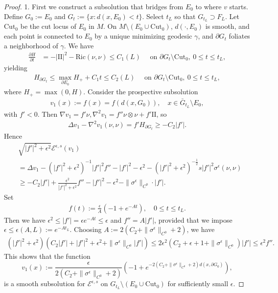 \documentclass[11pt, letterpaper]{amsart}
\theoremstyle{definition}
\theoremstyle{remark}
\begin{document}
\begin{appendix}
\begin{proof}
	1. First we construct a subsolution that bridges from $E_0$ to where $v$ starts. Define $G_0 := E_0$ and $G_t := \{x: d(x, E_0) < t\} $. Select $t_L$ so that $G_{t_L} \supset F_L$. Let $\mathrm{Cut}_0$ be the cut locus of $E_0$ in $M$. On $M \setminus (E_0 \cup \mathrm{Cut}_0)$, $d(\cdot , E_0)$ is smooth, and each point is connected to $E_0$ by a unique minimizing geodesic $\gamma $, and $\partial G_t$ foliates a neighborhood of $\gamma $. We have
	\begin{align*}
		\frac{\partial H}{\partial t} &= - |\mathrm{II}|^2 - \mathrm{Ric}(\nu ,\nu ) \leq C_1(L)\quad  \text{ on } \partial G_t \setminus \mathrm{Cut}_0, \ 0 \leq t \leq t_L,
	\end{align*} 
	yielding
	\begin{align*}
		H_{\partial G_t} \leq \max_{\partial E_0} H_{+} + C_1 t \leq C_2(L) \quad  \text{ on } \partial G_t \setminus \mathrm{Cut}_0, \ 0 \leq t \leq t_L,
	\end{align*} 
	where $H_{+} = \max (0, H)$.  Consider the prospective subsolution
	\begin{align*}
		v_1(x) := f(x) = f(d(x, G_0) ),\quad x \in \bar{G}_{t_L}\setminus E_0,
	\end{align*} 
	with $f'<0$. Then $\nabla v_1 = f' \nu , \nabla ^2 v_1 = f'' \nu \otimes \nu + f' \mathrm{II}$, so
	\begin{align*}
		\Delta v_1 - \nabla ^2 v_1(\nu ,\nu ) = f' H_{\partial G_t} \geq - C_2|f'| .
	\end{align*} 
	Hence
	\begin{align*}
		&\sqrt{|f'|^2+ \epsilon ^2} \mathcal{E}^{\epsilon ,s}(v_1) \\
		&= \Delta v_1 -  \left( |f'|^2 + \epsilon ^2 \right) ^{-1} |f'|^2 f'' - |f'|^2- \epsilon ^2 - \left( |f'|^2+ \epsilon ^2 \right) ^{-\frac{1}{2}} s|f'|^2 \sigma ^{\epsilon } (\nu ,\nu ) \\
		&\geq -C_2 |f'| + \frac{\epsilon ^2}{|f'|^2+ \epsilon ^2} f''- |f'|^2- \epsilon ^2 - \|\sigma ^{\epsilon } \|_{C^0}\cdot |f'|.
	\end{align*} 
	Set
	\begin{align*}
		f(t) := \frac{\epsilon }{A}(-1 + e ^{-A t}),\quad 0 \leq t \leq t_L	.
	\end{align*} 
	Then we have $\epsilon ^2 \leq |f'| = \epsilon e^{-At} \leq \epsilon $ and $f''  = A |f'|$, provided that we impose $\epsilon \leq \epsilon (A,L):= e^{-A t_L}$. Choosing $A:= 2(C_2+\|\sigma^{\epsilon } \|_{C^0}+2)$, we have
	\begin{align*}
		(|f'|^2+ \epsilon ^2) \left( C_2|f'| + |f'|^2 + \epsilon ^2 + \|\sigma^{\epsilon } \|_{C^0} |f'| \right) \leq 2 \epsilon ^2 \left( C_2 + \epsilon + 1+ \|\sigma^{\epsilon } \|_{C^0} \right)  |f'| \leq \epsilon ^2 f''. 
	\end{align*} 
	This shows that the function
	$$v_1(x) := \frac{\epsilon }{2(C_2+\|\sigma ^{\epsilon } \|_{C^0} + 2)} \left( -1 + e^{- 2(C_2+\|\sigma ^{\epsilon } \|_{C^0}+2) d(x, \partial G_0)} \right) ,$$ 
	is a smooth subsolution for $\mathcal{E}^{\epsilon ,s}$ on $G_{t_L} \setminus (E_0 \cup \mathrm{Cut}_0)$ for sufficiently small $\epsilon $.


\end{proof}
\end{appendix}
\end{document}
